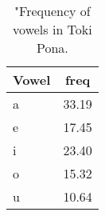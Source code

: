 \begin{table*}[h!]
\begin{center}
\caption{"Frequency of vowels in Toki Pona.}
\begin{tabular}{| l | c |}\hline
Vowel & freq \\\hline
a & 33.19 \\\hline
e & 17.45 \\\hline
i & 23.40 \\\hline
o & 15.32 \\\hline
u & 10.64 \\\hline
\end{tabular}\end{center}
\end{table*}